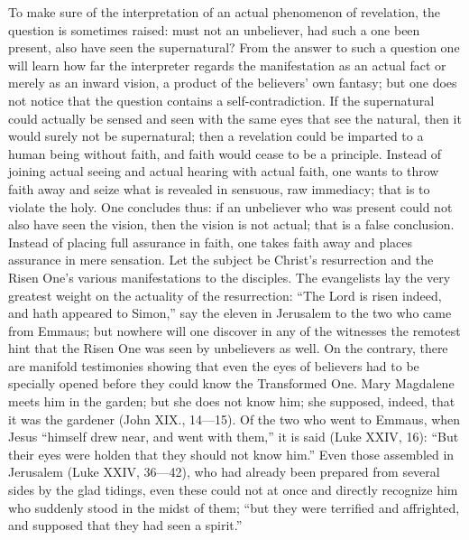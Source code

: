 \documentclass[12pt]{book}
\newcommand{\opage}[1]{\marginnote{\footnotesize\textit{[#1]}}}
\begin{document}
To make sure of the interpretation of an actual phenomenon of
revelation, the question is sometimes raised: must not an unbeliever,
had such a one been present, also have seen the supernatural? From the
answer to such a question one will learn how far the interpreter
regards the manifestation as an actual fact or merely as an inward
vision, a product of the believers' own fantasy; but one does not
notice that the question contains a self-contradiction. If the
supernatural could actually be sensed and seen with the same eyes that
see the natural, then it would surely not be supernatural; then a
revelation could be imparted to a human being without faith, and faith
\opage{172}\setcounter{footnote}{0}%
would cease to be a principle. Instead of joining actual seeing and
actual hearing with actual faith, one wants to throw faith away and
seize what is revealed in sensuous, raw immediacy; that is to violate
the holy. One concludes thus: if an unbeliever who was present could not
also have seen the vision, then the vision is not actual; that is a
false conclusion. Instead of placing full assurance in faith, one takes
faith away and places assurance in mere sensation. Let the subject be
Christ's resurrection and the Risen One's various manifestations to the
disciples. The evangelists lay the very greatest weight on the actuality
of the resurrection: ``The Lord is risen indeed, and hath appeared to
Simon,'' say the eleven in Jerusalem to the two who came from Emmaus;
but nowhere will one discover in any of the witnesses the remotest hint
that the Risen One was seen by unbelievers as well. On the contrary,
there are manifold testimonies showing that even the eyes of believers
had to be specially opened before they could know the Transformed One.
Mary Magdalene meets him in the garden; but she does not know him; she
supposed, indeed, that it was the gardener (John XIX., 14---15). Of the
two who went to Emmaus, when Jesus ``himself drew near, and went with
them,'' it is said (Luke XXIV, 16): ``But their eyes were holden that
they should not know him.'' Even those assembled in Jerusalem (Luke
XXIV, 36---42), who had already been prepared from several sides by the
glad tidings, even these could not at once and directly recognize him
who suddenly stood in the midst of them; ``but they were terrified and
affrighted, and supposed that they had seen a spirit.''
\end{document}
